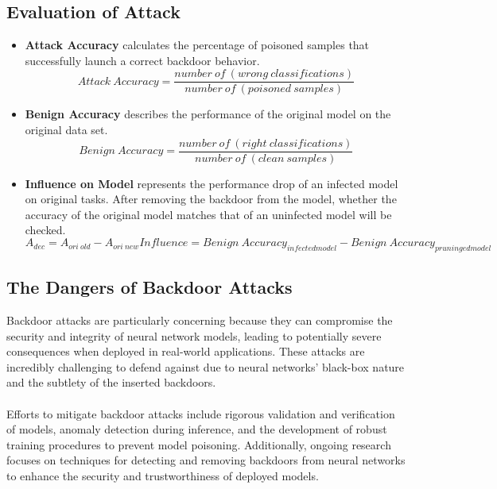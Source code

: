\documentclass[english,version-2022-01]{uzl-thesis}
\begin{document}
\subsection{Evaluation of Attack}
\label{eva}
\begin{itemize}
    \item \textbf{Attack Accuracy} calculates the percentage of poisoned samples that successfully launch a correct backdoor behavior.\label{Attack Accuracy}
    \begin{equation*}
        Attack\  Accuracy=\frac{number\ of\ (wrong\ classifications)}{number\ of\ (poisoned\ samples)}
     \end{equation*}
     \item \textbf{Benign Accuracy} describes the performance of the original model on the original data set.\label{Benign Accuracy}\\
    \begin{equation*}
        Benign\  Accuracy=\frac{number\ of\ (right\ classifications)}{number\ of\ (clean\ samples)}
    \end{equation*}
    \item  \textbf{Influence on Model} represents the performance drop of an infected model on original tasks. After removing the backdoor from the model, whether the accuracy of the original model matches that of an uninfected model will be checked.\label{Influence on Model}\\
    \begin{equation*}
        A_{dec}=A_{ori\ old}-A_{ori\ new}
        Influence = Benign\  Accuracy_{infected model} - Benign\  Accuracy_{pruninged model}
    \end{equation*}
\end{itemize}

\subsection{The Dangers of Backdoor Attacks}
Backdoor attacks are particularly concerning because they can compromise the security and integrity of neural network models, leading to potentially severe consequences when deployed in real-world applications. These attacks are incredibly challenging to defend against due to neural networks' black-box nature and the subtlety of the inserted backdoors.\\
\\
Efforts to mitigate backdoor attacks include rigorous validation and verification of models, anomaly detection during inference, and the development of robust training procedures to prevent model poisoning. Additionally, ongoing research focuses on techniques for detecting and removing backdoors from neural networks to enhance the security and trustworthiness of deployed models.
\end{document}
